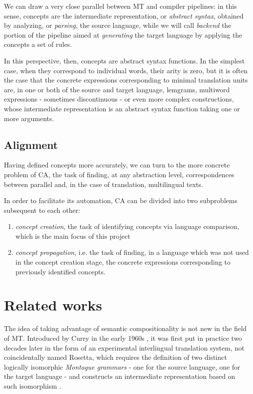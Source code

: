 \documentclass{article}
\begin{document}
We can draw a very close parallel between MT and compiler pipelines: in this sense, concepts are the intermediate representation, or \textit{abstract syntax}, obtained by analyzing, or \textit{parsing}, the source language, while we will call \textit{backend} the portion of the pipeline aimed at \textit{generating} the target language by applying the concepts a set of rules.

In this perspective, then, concepts are abstract syntax functions. In the simplest case, when they correspond to individual words, their arity is zero, but it is often the case that the concrete expressions corresponding to minimal translation units are, in one or both of the source and target language, lemgrams, multiword expressions - sometimes discontinuous - or even more complex constructions, whose intermediate representation is an abstract syntax function taking one or more arguments.

\subsection{Alignment}
Having defined concepts more accurately, we can turn to the more concrete problem of CA, the task of finding, at any abstraction level, correspondences between parallel and, in the case of translation, multilingual texts.

In order to facilitate its automation, CA can be divided into two subproblems subsequent to each other:
\begin{enumerate}
    \item \textit{concept creation}, the task of identifying concepts via language comparison, which is the main focus of this project
    \item \textit{concept propagation}, i.e. the task of finding, in a language which was not used in the concept creation stage, the concrete expressions corresponding to previously identified concepts.
\end{enumerate}


\section{Related works} 
The idea of taking advantage of semantic compositionality is not new in the field of MT. Introduced by Curry in the early 1960s \cite{curry61}, it was first put in practice two decades later in the form of an experimental interlingual translation system, not coincidentally named Rosetta, which requires the definition of two distinct logically isomorphic \textit{Montague grammars} - one for the source language, one for the target language - and constructs an intermediate representation based on such isomorphism \cite{rosetta}. 
\end{document}
